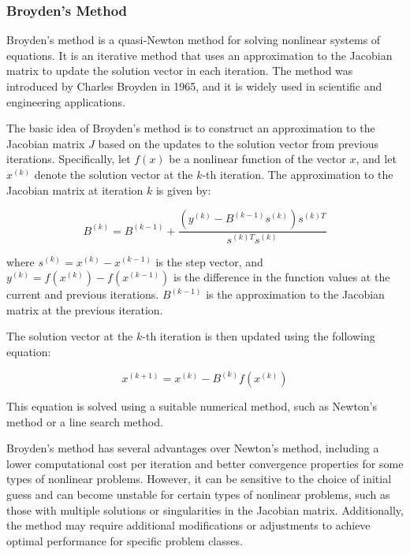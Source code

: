 \subsubsection{Broyden's Method}
\label{subsubsec:broyden_method}


Broyden's method is a quasi-Newton method for solving nonlinear systems of equations. It is an iterative method that uses an approximation to the Jacobian matrix to update the solution vector in each iteration. The method was introduced by Charles Broyden in 1965, and it is widely used in scientific and engineering applications.

The basic idea of Broyden's method is to construct an approximation to the Jacobian matrix $J$ based on the updates to the solution vector from previous iterations. Specifically, let $f(x)$ be a nonlinear function of the vector $x$, and let $x^{(k)}$ denote the solution vector at the $k$-th iteration. The approximation to the Jacobian matrix at iteration $k$ is given by:

\begin{equation}
B^{(k)} = B^{(k-1)} + \frac{(y^{(k)} - B^{(k-1)}s^{(k)})s^{(k)T}}{s^{(k)T}s^{(k)}}
\end{equation}

where $s^{(k)} = x^{(k)} - x^{(k-1)}$ is the step vector, and $y^{(k)} = f(x^{(k)}) - f(x^{(k-1)})$ is the difference in the function values at the current and previous iterations. $B^{(k-1)}$ is the approximation to the Jacobian matrix at the previous iteration.

The solution vector at the $k$-th iteration is then updated using the following equation:

\begin{equation}
x^{(k+1)} = x^{(k)} - B^{(k)}f(x^{(k)})
\end{equation}

This equation is solved using a suitable numerical method, such as Newton's method or a line search method.

Broyden's method has several advantages over Newton's method, including a lower computational cost per iteration and better convergence properties for some types of nonlinear problems. However, it can be sensitive to the choice of initial guess and can become unstable for certain types of nonlinear problems, such as those with multiple solutions or singularities in the Jacobian matrix. Additionally, the method may require additional modifications or adjustments to achieve optimal performance for specific problem classes.

